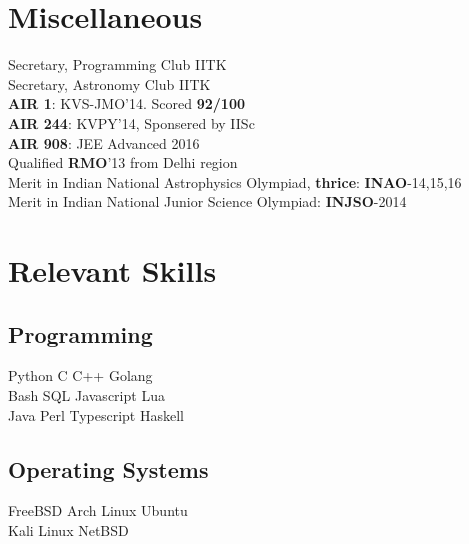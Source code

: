 \documentclass[]{deedy-resume-openfont}
\begin{document}
\begin{minipage}[t]{0.30\textwidth}
\section{Miscellaneous}
\vspace{0.1cm}
Secretary, Programming Club IITK \\
\vspace{0.1cm}
Secretary, Astronomy Club IITK \\
\vspace{0.1cm}
\textbf{AIR 1}: KVS-JMO'14. Scored \textbf{92/100}\\
\vspace{0.1cm}
\textbf{AIR 244}: KVPY'14, Sponsered by IISc \\
\vspace{0.1cm}
\textbf{AIR 908}: JEE Advanced 2016\\
\vspace{0.1cm}
Qualified \textbf{RMO}'13 from Delhi region\\
\vspace{0.1cm}
Merit in Indian National Astrophysics Olympiad, \textbf{thrice}: \textbf{INAO}-14,15,16 \\
\vspace{0.1cm}
Merit in Indian National Junior Science Olympiad: \textbf{INJSO}-2014 \\


\section{Relevant Skills}
\subsection{Programming}
Python \textbullet{} C \textbullet{} C++ \textbullet{} Golang \\
 \vspace{0.1 cm}
Bash \textbullet{} SQL \textbullet{} Javascript \textbullet{}  Lua \\
 Java \textbullet{} Perl \textbullet{} Typescript \textbullet{} Haskell \\
\vspace{0.4 cm}
\subsection{Operating Systems}
FreeBSD \textbullet{} Arch Linux \textbullet{} Ubuntu \\
Kali Linux \textbullet{} NetBSD
\vspace{0.4 cm}

\end{minipage}
\end{document}
